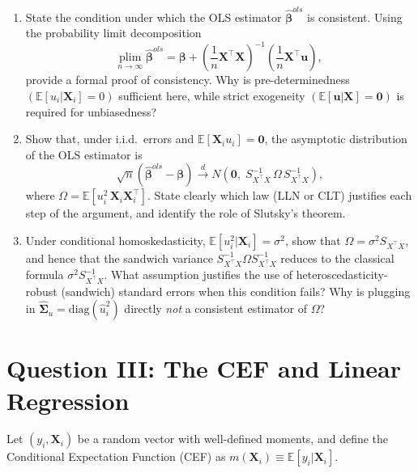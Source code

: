 \documentclass[letterpaper,12pt]{article}
\begin{document}
\begin{enumerate}[label=(\alph*)]

\item State the condition under which the OLS estimator $\hat{\boldsymbol{\beta}}^{ols}$ is consistent. Using the probability limit decomposition
\[
\underset{n\to\infty}{\mathrm{plim}}\;\hat{\boldsymbol{\beta}}^{ols}
= \boldsymbol{\beta}
+ \left(\frac{1}{n}\mathbf{X}^\top\mathbf{X}\right)^{-1}
  \left(\frac{1}{n}\mathbf{X}^\top\mathbf{u}\right),
\]
provide a formal proof of consistency. Why is pre-determinedness $\left(\mathbb{E}[u_i|\mathbf{X}_i]=0\right)$ sufficient here, while strict exogeneity $\left(\mathbb{E}[\mathbf{u}|\mathbf{X}]=\mathbf{0}\right)$ is required for unbiasedness?

\item Show that, under i.i.d.\ errors and $\mathbb{E}[\mathbf{X}_i u_i]=\mathbf{0}$, the asymptotic distribution of the OLS estimator is
\[
\sqrt{n}\left(\hat{\boldsymbol{\beta}}^{ols}-\boldsymbol{\beta}\right)
\xrightarrow{d}
N\!\left(\mathbf{0},\; S_{X^\top X}^{-1}\,\Omega\, S_{X^\top X}^{-1}\right),
\]
where $\Omega = \mathbb{E}[u_i^2\, \mathbf{X}_i\mathbf{X}_i^\top]$. State clearly which law (LLN or CLT) justifies each step of the argument, and identify the role of Slutsky's theorem.

\item Under conditional homoskedasticity, $\mathbb{E}[u_i^2|\mathbf{X}_i]=\sigma^2$, show that $\Omega = \sigma^2 S_{X^\top X}$, and hence that the sandwich variance $S_{X^\top X}^{-1}\Omega S_{X^\top X}^{-1}$ reduces to the classical formula $\sigma^2 S_{X^\top X}^{-1}$. What assumption justifies the use of heteroscedasticity-robust (sandwich) standard errors when this condition fails? Why is plugging in $\hat{\bm{\Sigma}}_u = \mathrm{diag}(\hat{u}_i^2)$ directly \textit{not} a consistent estimator of $\Omega$?

\end{enumerate}

\section*{Question III: The CEF and Linear Regression}

Let $(y_i, \mathbf{X}_i)$ be a random vector with well-defined moments, and define the Conditional Expectation Function (CEF) as $m(\mathbf{X}_i)\equiv\mathbb{E}[y_i|\mathbf{X}_i]$.
\end{document}
